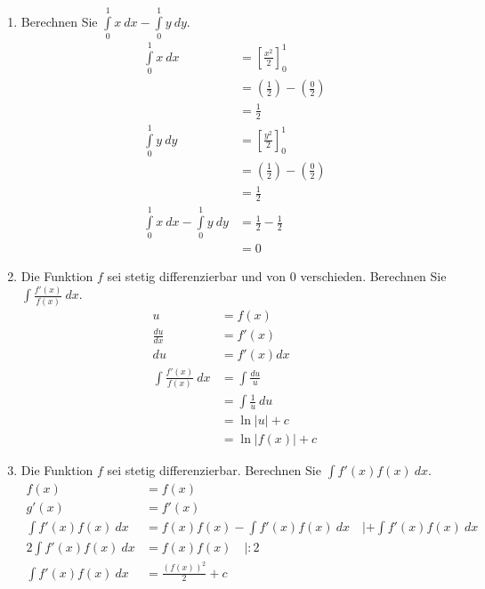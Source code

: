 \documentclass[12pt]{article}
\begin{document}

\noindent
\begin{enumerate}[start=1,label={\bfseries Frage \arabic*:},leftmargin=1in]

    \item Berechnen Sie $\int\limits_0^1 x \: dx - \int\limits_0^1 y \: dy$.
    \begin{align*}
        \int\limits_0^1 x \: dx &= \left[\frac{x^2}{2}\right]_0^1 \\
        &=\left(\frac{1}{2}\right) - \left(\frac{0}{2}\right) \\
        &=\frac{1}{2} \\
        \int\limits_0^1 y \: dy &= \left[\frac{y^2}{2}\right]_0^1 \\
        &=\left(\frac{1}{2}\right) - \left(\frac{0}{2}\right) \\
        &=\frac{1}{2} \\
        \int\limits_0^1 x \: dx - \int\limits_0^1 y \: dy &= \frac{1}{2} - \frac{1}{2} \\
        &=0
    \end{align*}

    \item Die Funktion $f$ sei stetig differenzierbar und von 0 verschieden. Berechnen Sie $\int \frac{f'(x)}{f(x)} \: dx$.
    \begin{align*}
        u&=f(x) \\
        \frac{du}{dx} &= f'(x) \\
        du &= f'(x) dx \\
        \int \frac{f'(x)}{f(x)} \: dx &= \int \frac{du}{u} \\
        &= \int \frac{1}{u} \: du \\
        &= \ln{|u|} + c \\
        &= \ln{|f(x)|} + c
    \end{align*}

    \item Die Funktion $f$ sei stetig differenzierbar. Berechnen Sie $\int f'(x)f(x) \: dx$.
    \begin{align*}
        f(x)&=f(x) \\
        g'(x)&=f'(x) \\
        \int f'(x)f(x) \: dx &= f(x)f(x) - \int f'(x)f(x) \: dx \quad | + \int f'(x)f(x) \: dx \\
        2 \int f'(x)f(x) \: dx &= f(x)f(x) \quad | :2 \\
        \int f'(x)f(x) \: dx &= \frac{(f(x))^2}{2} + c
    \end{align*}


\end{enumerate}
\end{document}
